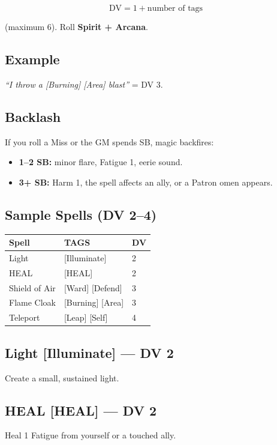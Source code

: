 \documentclass[11pt]{book}
\begin{document}
\[
\text{DV} = 1 + \text{number of tags}
\]

(maximum 6). Roll \textbf{Spirit + Arcana}.

\subsection*{Example}
\textit{``I throw a [Burning] [Area] blast''} = DV 3.

\subsection*{Backlash}

If you roll a Miss or the GM spends SB, magic backfires:

\begin{itemize}
  \item \textbf{1--2 SB:} minor flare, Fatigue 1, eerie sound.
  \item \textbf{3+ SB:} Harm 1, the spell affects an ally, or a Patron omen appears.
\end{itemize}

\subsection*{Sample Spells (DV 2--4)}

\begin{center}
\begin{tabular}{lll}
\toprule
\textbf{Spell} & \textbf{TAGS} & \textbf{DV} \\
\midrule
Light & [Illuminate] & 2 \\
HEAL & [HEAL] & 2 \\
Shield of Air & [Ward] [Defend] & 3 \\
Flame Cloak & [Burning] [Area] & 3 \\
Teleport & [Leap] [Self] & 4 \\
\bottomrule
\end{tabular}
\end{center}

\subsection*{Light [Illuminate] --- DV 2}
Create a small, sustained light.

\subsection*{HEAL [HEAL] --- DV 2}
Heal 1 Fatigue from yourself or a touched ally.
\end{document}
